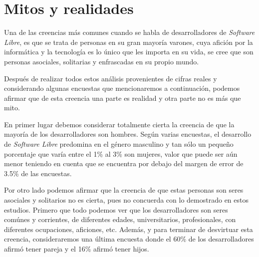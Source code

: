 \section{Mitos y realidades}

Una de las creencias más comunes cuando se habla de desarrolladores de \textit{Software Libre}, es que se trata de personas en su gran mayoría varones, cuya afición por la informática y la tecnología es lo único que les importa en su vida, se cree que son personas asociales, solitarias y enfrascadas en su propio mundo.

Después de realizar todos estos análisis provenientes de cifras reales y considerando algunas encuestas que mencionaremos a continuación, podemos afirmar que de esta creencia una parte es realidad y otra parte no es más que mito.

En primer lugar debemos considerar totalmente cierta la creencia de que la mayoría de los desarrolladores son hombres. Según varias encuestas, el desarrollo de \textit{Software Libre} predomina en el género masculino y tan sólo un pequeño porcentaje que varía entre el 1\% al 3\% son mujeres, valor que puede ser aún menor teniendo en cuenta que se encuentra por debajo del margen de error de 3.5\% de las encuestas.

Por otro lado podemos afirmar que la creencia de que estas personas son seres asociales y solitarios no es cierta, pues no concuerda con lo demostrado en estos estudios. Primero que todo podemos ver que los desarrolladores son seres comúnes y corrientes, de diferentes edades, universitarios, profesionales, con diferentes ocupaciones, aficiones, etc. Además, y para terminar de desvirtuar esta creencia, consideraremos una última encuesta donde el 60\% de los desarrolladores afirmó tener pareja y el 16\% afirmó tener hijos.
